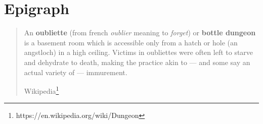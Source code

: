 
\chapter{Epigraph}

\begin{quote}
An \textbf{oubliette} (from french \textit{oublier} meaning to \textit{forget}) or \textbf{bottle dungeon} is a basement room which is accessible only from a hatch or hole (an angstloch) in a high ceiling. Victims in oubliettes were often left to starve and dehydrate to death, making the practice akin to — and some say an actual variety of — immurement.

\hspace*{\fill} {\fontsize{10}{12}\selectfont Wikipedia\footnote{https://en.wikipedia.org/wiki/Dungeon}}

\end{quote}
